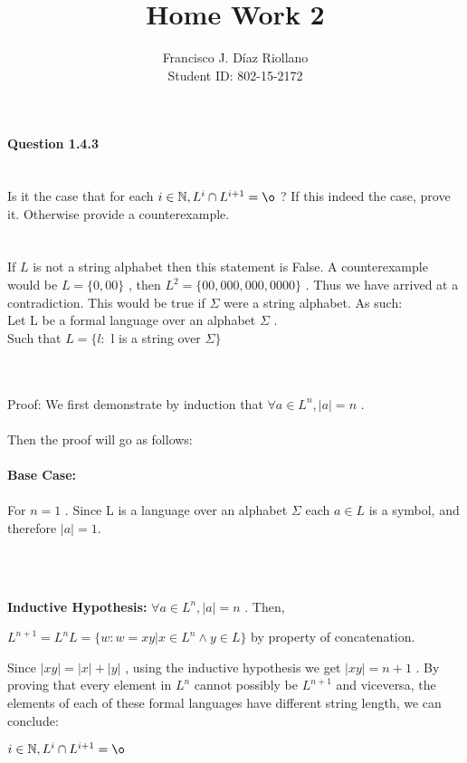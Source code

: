 \documentclass{report}
\title{Home Work 2}
\author{Francisco J. Díaz Riollano \\ Student ID: 802-15-2172 }
\newcommand{\me}[1]{
\begin{math}
#1
\end{math}
}
\begin{document}
\maketitle
\paragraph{\Large{Question 1.4.3\\ \\}}
 Is it the case that for each \me{i \in \mathbb{N},L^i \cap L^{i+1} = \o} ? If this indeed the case, prove it. Otherwise provide a counterexample.\\
 \\ \\

If \me{L} is not a string alphabet then this statement is False. A counterexample would be \me{L =\{0,00\}}, then \me{L^2 = \{00,000,000,0000\}}. Thus we have arrived at a contradiction.
\newline
This would be true if \me{\Sigma} were a string alphabet. As such:
\\ Let L be a formal language over an alphabet \me{\Sigma}.\\  Such that \me{L = \{l:} l is a string over \me{\Sigma \}}
\\ \\
Proof:
We first demonstrate by induction that \me{\forall a \in L^n,|a| = n}. \\ \\
Then the proof will go as follows:
\\ \\
\textbf{Base Case:} \\ \\
For \me{n=1}. Since L is a language over an alphabet \me{\Sigma} each \me{a \in L} is a symbol, and therefore \me{|a|=1.}
\\ \\
\begin{flushleft}
	\textbf{Inductive Hypothesis:} \me{\forall a \in L^n, |a|=n}. Then,
	\me{ L^{n+1} = L^nL= \{w:w =xy| x \in L^n \land y \in L\}} by property of concatenation.
	
	Since \me{|xy|  = |x| + |y|}, using the inductive hypothesis we get \me{|xy| = n +1}.
	\newline \newline
	By proving that every element in \me{L^n} cannot possibly be \me{L^{n+1}} and viceversa, the elements of each of these formal languages have different string length, we can conclude:
\newline \newline
	\me{i \in \mathbb{N},L^i \cap L^{i+1} = \o} 




\end{flushleft}



 
\end{document}
